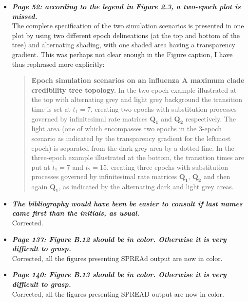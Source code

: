 \documentclass[english]{article}
\begin{document}
\begin{itemize}
\item {
{\it
\textbf{
Page 52: according to the legend in Figure 2.3, a two-epoch plot is missed.
}%
}%
}%
\\
The complete specification of the two simulation scenarios is presented in one plot by using two different epoch delineations (at the top and bottom of the tree) 
and alternating shading, with one shaded area having a transparency gradient.
This was perhaps not clear enough in the Figure caption, I have thus rephrased more explicitly:

\begin{quote}
{\bf  Epoch simulation scenarios on an influenza A maximum clade credibility tree topology.} 
In the two-epoch example illustrated at the top with alternating grey and light grey background
the transition time is set at $t_{1}=7$, creating two epochs with substitution processes governed by infinitesimal rate matrices $\mathbf{Q_{1}}$ and $\mathbf{Q_{2}}$ respectively.
The light area (one of which encompasses  two epochs in the 3-epoch scenario as indicated by the transparency gradient for the leftmost epoch) is separated from the dark grey area by a dotted line.
In the three-epoch example illustrated 
at the bottom, %
the transition times are put at $t_{1}=7$ and $t_{2}=15$, creating three epochs with substitution processes governed by infinitesimal rate matrices $\mathbf{Q_{1}}$, $\mathbf{Q_{2}}$ and then again $\mathbf{Q_{1}}$, as indicated by the alternating dark and light grey areas.
\end{quote}



\item {
{\it
\textbf{
The bibliography would have been be easier to consult if last names came first than the initials, as usual.
}%
}%
}%
\\
Corrected.


\item {
{\it
\textbf{
Page 137: Figure B.12 should be in color. 
Otherwise it is very difficult to grasp.
}%
}%
}%
\\
Corrected, all the figures presenting SPREAd output are now in color.

\item {
{\it
\textbf{
Page 140: Figure B.13 should be in color. 
Otherwise it is very difficult to grasp.
}%
}%
}%
\\
Corrected, all the figures presenting SPREAD output are now in color.



\end{itemize}
\end{document}

